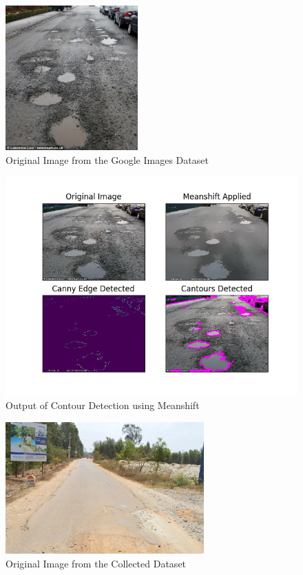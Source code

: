 \documentclass[12pt,a4paper]{article}
\begin{document}
\begin{itemize}
    \begin{figure}[ht!]
        \centering
        \includegraphics[width = 2in]{images/road_10.jpg}
        \caption{Original Image from the Google Images Dataset}
    \end{figure}

    \begin{figure}[ht!]
        \centering
        \includegraphics[width = 5in]{images/meanshift_2.png}
        \caption{Output of Contour Detection using Meanshift}
    \end{figure}
    \pagebreak
    
    \begin{figure}[ht!]
        \centering
        \includegraphics[width = 3in]{images/road_cam_25.jpg}
        \caption{Original Image from the Collected Dataset}
    \end{figure}


\end{itemize}
\end{document}
